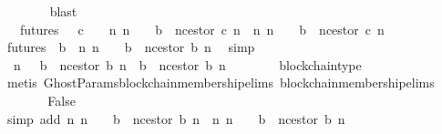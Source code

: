 \begin{isabellebody}
\ \ \ \ \ \ \isamarkupfalse%
\ blast\isanewline
\ \ \ \ \isamarkupfalse%
\ {\isachardoublequoteopen}{\isasymexists}\ {\isasymsigma}\ {\isasymin}futures\ {\isasymsigma}{\isachardot}\ {\isasymexists}\ c\ {\isasymin}\ {\isasymepsilon}\ {\isasymsigma}{\isachardot}\ {\isacharparenleft}{\isasymexists}n{\isachardot}\ n\ {\isasymin}\ {\isasymnat}\ {\isasymand}\ b{}\ {\isacharequal}\ n{\isacharunderscore}cestor\ {\isacharparenleft}c{\isacharcomma}\ n{\isacharparenright}{\isacharparenright}\ {\isasymand}\ {\isacharparenleft}{\isasymexists}n{\isacharprime}{\isachardot}\ n{\isacharprime}\ {\isasymin}\ {\isasymnat}\ {\isasymand}\ b{}\ {\isacharequal}\ n{\isacharunderscore}cestor\ {\isacharparenleft}c{\isacharcomma}\ n{\isacharprime}{\isacharparenright}{\isacharparenright}{\isachardoublequoteclose}\isanewline
\ \ \ \ \ \ \isamarkupfalse%
\ {\isacartoucheopen}{\isasymforall}{\isasymsigma}{\isasymin}futures\ {\isasymsigma}{\isachardot}\ {\isasymforall}b{\isacharprime}{\isasymin}{\isasymepsilon}\ {\isasymsigma}{\isachardot}\ {\isasymexists}n{\isachardot}\ n\ {\isasymin}\ {\isasymnat}\ {\isasymand}\ b{}\ {\isacharequal}\ n{\isacharunderscore}cestor\ {\isacharparenleft}b{\isacharprime}{\isacharcomma}\ n{\isacharparenright}{\isacartoucheclose}\ \isamarkupfalse%
\ simp\isanewline
\ \ \ \ \isamarkupfalse%
\ {\isachardoublequoteopen}{\isasymexists}\ n\ {\isasymin}\ {\isasymnat}{\isachardot}\ b{}\ {\isacharequal}\ n{\isacharunderscore}cestor\ {\isacharparenleft}b{}{\isacharcomma}\ n{\isacharparenright}\ {\isasymor}\ b{}\ {\isacharequal}\ n{\isacharunderscore}cestor\ {\isacharparenleft}b{}{\isacharcomma}\ n{\isacharparenright}{\isachardoublequoteclose}\isanewline
\ \ \ \ \ \ \isamarkupfalse%
\ blockchain{\isacharunderscore}type\isanewline
\ \ \ \ \ \ \isamarkupfalse%
\ {\isacharparenleft}metis\ GhostParams{\isachardot}blockchain{\isacharunderscore}membership{\isachardot}elims{\isacharparenleft}{}{\isacharparenright}\ blockchain{\isacharunderscore}membership{\isachardot}elims{\isacharparenleft}{}{\isacharparenright}{\isacharparenright}\isanewline
\ \ \ \ \isamarkupfalse%
\ \isamarkupfalse%
\ False\isanewline
\ \ \ \ \ \ \isamarkupfalse%
\ {\isacharparenleft}simp\ add{\isacharcolon}\ {\isacartoucheopen}{\isacharparenleft}{\isasymforall}n{\isachardot}\ n\ {\isasymin}\ {\isasymnat}\ {\isasymlongrightarrow}\ b{}\ {\isasymnoteq}\ n{\isacharunderscore}cestor\ {\isacharparenleft}b{}{\isacharcomma}\ n{\isacharparenright}{\isacharparenright}\ {\isasymand}\ {\isacharparenleft}{\isasymforall}n{\isachardot}\ n\ {\isasymin}\ {\isasymnat}\ {\isasymlongrightarrow}\ b{}\ {\isasymnoteq}\ n{\isacharunderscore}cestor\ {\isacharparenleft}b{}{\isacharcomma}\ n{\isacharparenright}{\isacharparenright}{\isacartoucheclose}{\isacharparenright}\isanewline

\end{isabellebody}

